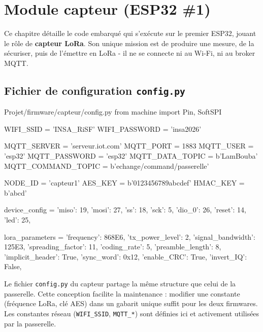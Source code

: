 \documentclass[a4paper,11pt]{report}
\begin{document}
\chapter{Module capteur (ESP32 \#1)}
\label{chap:capteur}

Ce chapitre détaille le code embarqué qui s'exécute sur le premier ESP32, jouant le rôle de
\textbf{capteur LoRa}. Son unique mission est de produire une mesure, de la sécuriser, puis de
l'émettre en LoRa - il ne se connecte ni au Wi-Fi, ni au broker MQTT.

\section{Fichier de configuration \texttt{config.py}}

\begin{pycode}{Projet/firmware/capteur/config.py}
from machine import Pin, SoftSPI

WIFI_SSID = 'INSA_RiSF'
WIFI_PASSWORD = 'insa2026'

MQTT_SERVER = 'serveur.iot.com'
MQTT_PORT = 1883
MQTT_USER = 'esp32'
MQTT_PASSWORD = 'esp32'
MQTT_DATA_TOPIC = b'LamBouba'
MQTT_COMMAND_TOPIC = b'echange/command/passerelle'

NODE_ID = 'capteur1'
AES_KEY = b'0123456789abcdef'
HMAC_KEY = b'abcd'

device_config = {
    'miso': 19,
    'mosi': 27,
    'ss': 18,
    'sck': 5,
    'dio_0': 26,
    'reset': 14,
    'led': 25,
}

lora_parameters = {
    'frequency': 868E6,
    'tx_power_level': 2,
    'signal_bandwidth': 125E3,
    'spreading_factor': 11,
    'coding_rate': 5,
    'preamble_length': 8,
    'implicit_header': True,
    'sync_word': 0x12,
    'enable_CRC': True,
    'invert_IQ': False,
}
\end{pycode}

\begin{explication}
Le fichier \texttt{config.py} du capteur partage la même structure que celui de la passerelle.
Cette conception facilite la maintenance : modifier une constante (fréquence LoRa, clé AES) dans
un gabarit unique suffit pour les deux firmwares. Les constantes réseau (\texttt{WIFI\_SSID},
\texttt{MQTT\_*}) sont définies ici et activement utilisées par la passerelle.
\end{explication}
\end{document}
